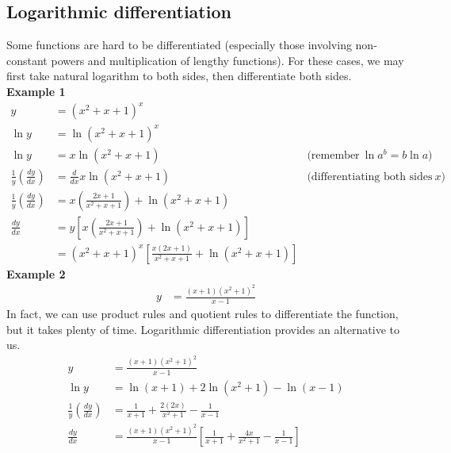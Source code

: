 \documentclass{article}
\begin{document}
\subsection{Logarithmic differentiation}
Some functions are hard to be differentiated
(especially those involving non-constant
powers and multiplication of lengthy
functions). For these cases, we may
first take natural logarithm to both
sides, then differentiate both sides.\\
\textbf{Example 1}
\begin{equation*}
\begin{aligned}
    y & =\left( x^{2} +x+1\right)^{x} & \\
    \ln y & =\ln\left( x^{2} +x+1\right)^{x} & \\
    \ln y & =x\ln\left( x^{2} +x+1\right) & \text{(remember} \ \ln a^{b} =b\ln a\text{)}\\
    \frac{1}{y}\left(\frac{dy}{dx}\right) & =\frac{d}{dx} x\ln\left( x^{2} +x+1\right) & \text{(differentiating both sides w.r.t.} \ x\text{)}\\
    \frac{1}{y}\left(\frac{dy}{dx}\right) & =x\left(\frac{2x+1}{x^{2} +x+1}\right) +\ln\left( x^{2} +x+1\right) & \\
    \frac{dy}{dx} & =y\left[ x\left(\frac{2x+1}{x^{2} +x+1}\right) +\ln\left( x^{2} +x+1\right)\right] & \\
    & =\left( x^{2} +x+1\right)^{x}\left[\frac{x( 2x+1)}{x^{2} +x+1} +\ln\left( x^{2} +x+1\right)\right] & 
\end{aligned}
\end{equation*}
\textbf{Example 2}
\begin{equation*}
\begin{aligned}
    y & =\frac{( x+1)\left( x^{2} +1\right)^{2}}{x-1}
\end{aligned}
\end{equation*}
In fact, we can use product rules and
quotient rules to differentiate the
function, but it takes plenty of time.
Logarithmic differentiation provides
an alternative to us.
\begin{equation*}
\begin{aligned}
    y & =\frac{( x+1)\left( x^{2} +1\right)^{2}}{x-1}\\
    \ln y & =\ln( x+1) +2\ln\left( x^{2} +1\right) -\ln( x-1)\\
    \frac{1}{y}\left(\frac{dy}{dx}\right) & =\frac{1}{x+1} +\frac{2( 2x)}{x^{2} +1} -\frac{1}{x-1}\\
    \frac{dy}{dx} & =\frac{( x+1)\left( x^{2} +1\right)^{2}}{x-1}\left[\frac{1}{x+1} +\frac{4x}{x^{2} +1} -\frac{1}{x-1}\right]
\end{aligned}
\end{equation*}
\end{document}
